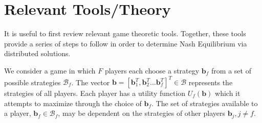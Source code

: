 \documentclass[12pt,a4paper]{report}
\begin{document}
\section{Relevant Tools/Theory}\label{tools}
It is useful to first review relevant game theoretic tools. Together, these tools provide a series of steps to follow in order to determine Nash Equilibrium via distributed solutions. 
\par
We consider a game in which $F$ players each choose a strategy $\mathbf{b}_{f}$ from a set of possible strategies $\mathcal{B}_f$. The vector $\mathbf{b}=[\mathbf{b}_{1}^T, \mathbf{b}_2^T... \mathbf{b}_{f}^T]^T \in \mathcal{B}$ represents the strategies of all players. Each player has a utility function $U_f(\mathbf{b})$ which it attempts to maximize through the choice of $\mathbf{b}_{f}$. The set of strategies available to a player, $\mathbf{b}_{f} \in\mathcal{B}_f$, may be dependent on the strategies of other players $\mathbf{b}_{j}, j \neq f $.
\end{document}
